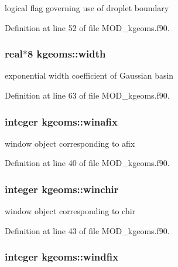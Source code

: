 logical flag governing use of droplet boundary 



Definition at line 52 of file M\-O\-D\-\_\-kgeoms.\-f90.

\hypertarget{classkgeoms_a2299a136a0ecee308c9a9eb100dbcdc9}{
\subsubsection[{width}]{\setlength{\rightskip}{0pt plus 5cm}real$\ast$8 kgeoms\-::width}}\label{classkgeoms_a2299a136a0ecee308c9a9eb100dbcdc9}


exponential width coefficient of Gaussian basin 



Definition at line 63 of file M\-O\-D\-\_\-kgeoms.\-f90.

\hypertarget{classkgeoms_adfe204b9072a92256edf2ae0577c0d1b}{
\subsubsection[{winafix}]{\setlength{\rightskip}{0pt plus 5cm}integer kgeoms\-::winafix}}\label{classkgeoms_adfe204b9072a92256edf2ae0577c0d1b}


window object corresponding to afix 



Definition at line 40 of file M\-O\-D\-\_\-kgeoms.\-f90.

\hypertarget{classkgeoms_aa6d82acf75d8341b25f961ed6d8dd6cc}{
\subsubsection[{winchir}]{\setlength{\rightskip}{0pt plus 5cm}integer kgeoms\-::winchir}}\label{classkgeoms_aa6d82acf75d8341b25f961ed6d8dd6cc}


window object corresponding to chir 



Definition at line 43 of file M\-O\-D\-\_\-kgeoms.\-f90.

\hypertarget{classkgeoms_a4c323319977ef1ccc31b0f82ed9eac11}{
\subsubsection[{windfix}]{\setlength{\rightskip}{0pt plus 5cm}integer kgeoms\-::windfix}}\label{classkgeoms_a4c323319977ef1ccc31b0f82ed9eac11}



